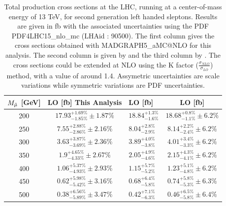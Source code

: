 \documentclass{cernatlasnote}
\begin{document}
\begin{table}
    \centering
    \begin{tabular}{ | c || c | m{6em} | c |}
        \hline
        \rowcolor{lightgray} 
         $M_{\Tilde{\mu}}$ [GeV]  & LO [fb] This Analysis & LO [fb] \cite{Fuks_2014}& LO [fb] \cite{Fiaschi_2018}\\
         \hline
         \hline
         200 & $17.93^{+1.69\%}_{-1.85\%} \pm 1.87\%$  & $18.84^{+1.3\%}_{-1.6\%}$ & $18.68^{+0.8\%}_{-1.1\%} \pm 6.2\%$ \\
         \hline
         250  & $7.55^{+2.88\%}_{-2.86\%} \pm 2.16\% $   & $8.04^{+2.8\%}_{-2.9\%}$  & $8.14^{+2.2\%}_{-2.4\%} \pm 6.2\%$  \\
         \hline
         300  & $3.63^{+3.87\%}_{-3.69\%} \pm 2.36\%$ & $3.89^{+4.0\%}_{-3.8\%}$  & $4.01^{+3.4\%}_{-3.3\%} \pm 6.2\%$ \\
         \hline
         350  & $1.9^{+4.65\%}_{-4.33\%} \pm 2.67\%$  & $2.05^{+4.9\%}_{-4.6\%}$  & $2.15^{+4.3\%}_{-4.1\%} \pm 6.2\%$ \\
         \hline
         400   & $1.06^{+5.37\%}_{-4.93\%} \pm 2.93\%$ & $1.15^{+5.7\%}_{-5.2\%}$   & $1.23^{+5.1\%}_{-4.8\%} \pm 6.2\%$ \\
         \hline
         450   & $0.62^{+5.98\%}_{-5.42\%} \pm 3.16\%$   & $0.68^{+6.4\%}_{-5.8\%}$  & $0.74^{+5.8\%}_{-5.3\%} \pm 6.3\%$ \\
         \hline
         500  & $0.38^{+6.56\%}_{-5.89\%} \pm 3.47\%$   & $0.42^{+7.1\%}_{-6.3\%}$  & $0.46^{+6.5\%}_{-5.8\%} \pm 6.4\%$ \\
         \hline
    \end{tabular}
    \caption{Total production cross sections at the LHC, running at a center-of-mass  energy of 13 TeV, for second generation left handed sleptons. Results are given in fb with the associated uncertainties using the PDF PDF4LHC15\_nlo\_mc (LHAid : 90500). The first column gives the cross sections obtained with MADGRAPH5\_aMC@NLO for this analysis. The second column is given by \cite{Fuks_2014} and the third column by \cite{Fiaschi_2018}. The cross sections could be extended at NLO using the K factor ($\frac{\sigma_{NLO}}{\sigma_{LO}}$) method, with a value of around 1.4. Assymetric uncertainties are scale variations while symmetric variations are PDF uncertainties.} 
    \label{tab:LEFTXS}
\end{table}
\FloatBarrier
\end{document}
